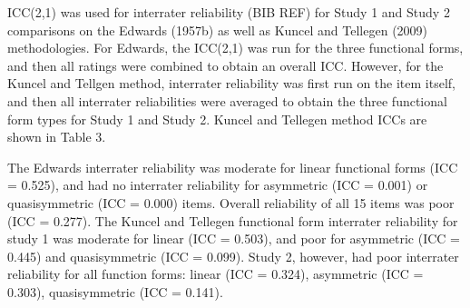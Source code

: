 \documentclass[
  ,jou]{apa6}
\begin{document}
ICC(2,1) was used for interrater reliability (BIB REF) for Study 1 and Study 2 comparisons on the Edwards (1957b) as well as Kuncel and Tellegen (2009) methodologies. For Edwards, the ICC(2,1) was run for the three functional forms, and then all ratings were combined to obtain an overall ICC. However, for the Kuncel and Tellgen method, interrater reliability was first run on the item itself, and then all interrater reliabilities were averaged to obtain the three functional form types for Study 1 and Study 2. Kuncel and Tellegen method ICCs are shown in Table 3.

The Edwards interrater reliability was moderate for linear functional forms (ICC = 0.525), and had no interrater reliability for asymmetric (ICC = 0.001) or quasisymmetric (ICC = 0.000) items. Overall reliability of all 15 items was poor (ICC = 0.277). The Kuncel and Tellegen functional form interrater reliability for study 1 was moderate for linear (ICC = 0.503), and poor for asymmetric (ICC = 0.445) and quasisymmetric (ICC = 0.099). Study 2, however, had poor interrater reliability for all function forms: linear (ICC = 0.324), asymmetric (ICC = 0.303), quasisymmetric (ICC = 0.141).
\end{document}
